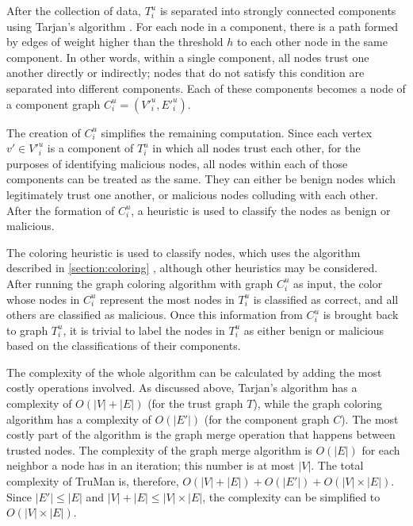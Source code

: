 \documentclass[conference]{IEEEtran}
\begin{document}

After the collection of data, $T^u_i$ is separated into strongly connected components using Tarjan's algorithm \cite{tarjan1972depth}.
For each node in a component, there is a path formed by edges of weight higher than the threshold $h$ to each other node in the same component.
In other words, within a single component, all nodes trust one another directly or indirectly; nodes that do not satisfy this condition are separated into different components.
Each of these components becomes a node of a component graph $C^u_i = (V'^u_i, E'^u_i)$.

The creation of $C^u_i$ simplifies the remaining computation.
Since each vertex $v' \in V'^u_i$ is a component of $T^u_i$ in which all nodes trust each other, for the purposes of identifying malicious nodes, all nodes within each of those components can be treated as the same.
They can either be benign nodes which legitimately trust one another, or malicious nodes colluding with each other.
After the formation of $C^u_i$, a heuristic is used to classify the nodes as benign or malicious.


The coloring heuristic is used to classify nodes, which uses the algorithm described in \autoref{section:coloring} \cite{mittal2011graph}, although other heuristics may be considered.
After running the graph coloring algorithm with graph $C^u_i$ as input, the color whose nodes in $C^u_i$ represent the most nodes in $T^u_i$ is classified as correct, and all others are classified as malicious.
Once this information from $C^u_i$ is brought back to graph $T^u_i$, it is trivial to label the nodes in $T^u_i$ as either benign or malicious based on the classifications of their components.


The complexity of the whole algorithm can be calculated by adding the most costly operations involved.
As discussed above, Tarjan's algorithm has a complexity of $O(|V|+|E|)$ (for the trust graph $T$), while the graph coloring algorithm has a complexity of $O(|E'|)$ (for the component graph $C$).
The most costly part of the algorithm is the graph merge operation that happens between trusted nodes.
The complexity of the graph merge algorithm is $O(|E|)$ for each neighbor a node has in an iteration; this number is at most $|V|$.
The total complexity of TruMan is, therefore, $O(|V|+|E|)+O(|E'|)+O(|V|\times |E|)$.
Since $|E'| \leq |E|$ and $|V|+|E| \leq |V|\times |E|$, the complexity can be simplified to $O(|V| \times |E|)$.
\end{document}
